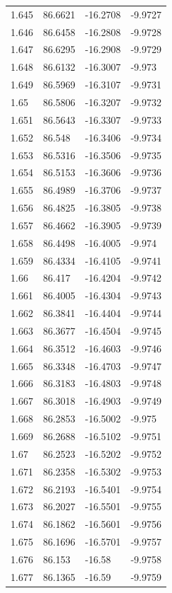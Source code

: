 \begin{tabular}{llll}
1.645 & 86.6621 & -16.2708 & -9.9727 \\
1.646 & 86.6458 & -16.2808 & -9.9728 \\
1.647 & 86.6295 & -16.2908 & -9.9729 \\
1.648 & 86.6132 & -16.3007 & -9.973 \\
1.649 & 86.5969 & -16.3107 & -9.9731 \\
1.65 & 86.5806 & -16.3207 & -9.9732 \\
1.651 & 86.5643 & -16.3307 & -9.9733 \\
1.652 & 86.548 & -16.3406 & -9.9734 \\
1.653 & 86.5316 & -16.3506 & -9.9735 \\
1.654 & 86.5153 & -16.3606 & -9.9736 \\
1.655 & 86.4989 & -16.3706 & -9.9737 \\
1.656 & 86.4825 & -16.3805 & -9.9738 \\
1.657 & 86.4662 & -16.3905 & -9.9739 \\
1.658 & 86.4498 & -16.4005 & -9.974 \\
1.659 & 86.4334 & -16.4105 & -9.9741 \\
1.66 & 86.417 & -16.4204 & -9.9742 \\
1.661 & 86.4005 & -16.4304 & -9.9743 \\
1.662 & 86.3841 & -16.4404 & -9.9744 \\
1.663 & 86.3677 & -16.4504 & -9.9745 \\
1.664 & 86.3512 & -16.4603 & -9.9746 \\
1.665 & 86.3348 & -16.4703 & -9.9747 \\
1.666 & 86.3183 & -16.4803 & -9.9748 \\
1.667 & 86.3018 & -16.4903 & -9.9749 \\
1.668 & 86.2853 & -16.5002 & -9.975 \\
1.669 & 86.2688 & -16.5102 & -9.9751 \\
1.67 & 86.2523 & -16.5202 & -9.9752 \\
1.671 & 86.2358 & -16.5302 & -9.9753 \\
1.672 & 86.2193 & -16.5401 & -9.9754 \\
1.673 & 86.2027 & -16.5501 & -9.9755 \\
1.674 & 86.1862 & -16.5601 & -9.9756 \\
1.675 & 86.1696 & -16.5701 & -9.9757 \\
1.676 & 86.153 & -16.58 & -9.9758 \\
1.677 & 86.1365 & -16.59 & -9.9759 \\

\end{tabular}
